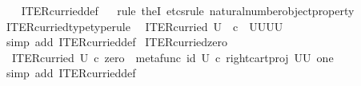 \begin{isabellebody}
%
\isadelimproof
\ \ %
\endisadelimproof
%
\isatagproof
{}\isamarkupfalse%
\ ITER{\isacharunderscore}{\kern0pt}curried{\isacharunderscore}{\kern0pt}def\isanewline
\ \ \isamarkupfalse%
{\isacharparenleft}{\kern0pt}rule\ theI{\isacharprime}{\kern0pt}{\isacharcomma}{\kern0pt}\ etcs{\isacharunderscore}{\kern0pt}rule\ natural{\isacharunderscore}{\kern0pt}number{\isacharunderscore}{\kern0pt}object{\isacharunderscore}{\kern0pt}property{}{\isacharparenright}{\kern0pt}%
\endisatagproof
{\isafoldproof}%
%
\isadelimproof
\isanewline
%
\endisadelimproof
\ \ \isanewline
{}\isamarkupfalse%
\ ITER{\isacharunderscore}{\kern0pt}curried{\isacharunderscore}{\kern0pt}type{\isacharbrackleft}{\kern0pt}type{\isacharunderscore}{\kern0pt}rule{\isacharbrackright}{\kern0pt}{\isacharcolon}{\kern0pt}\isanewline
\ \ {\isachardoublequoteopen}ITER{\isacharunderscore}{\kern0pt}curried\ U\ {\isacharcolon}{\kern0pt}\ {\isasymnat}\isactrlsub c\ {\isasymrightarrow}\ {\isacharparenleft}{\kern0pt}U\isactrlbsup U\isactrlesup {\isacharparenright}{\kern0pt}\isactrlbsup U\isactrlbsup U\isactrlesup \isactrlesup {\isachardoublequoteclose}\isanewline
%
\isadelimproof
\ \ %
\endisadelimproof
%
\isatagproof
{}\isamarkupfalse%
\ {\isacharparenleft}{\kern0pt}simp\ add{\isacharcolon}{\kern0pt}\ ITER{\isacharunderscore}{\kern0pt}curried{\isacharunderscore}{\kern0pt}def{}{\isacharparenright}{\kern0pt}%
\endisatagproof
{\isafoldproof}%
%
\isadelimproof
\isanewline
%
\endisadelimproof
\isanewline
{}\isamarkupfalse%
\ ITER{\isacharunderscore}{\kern0pt}curried{\isacharunderscore}{\kern0pt}zero{\isacharcolon}{\kern0pt}\ \isanewline
\ \ {\isachardoublequoteopen}ITER{\isacharunderscore}{\kern0pt}curried\ U\ {\isasymcirc}\isactrlsub c\ zero\ {\isacharequal}{\kern0pt}\ {\isacharparenleft}{\kern0pt}metafunc\ {\isacharparenleft}{\kern0pt}id\ U{\isacharparenright}{\kern0pt}\ {\isasymcirc}\isactrlsub c\ {\isacharparenleft}{\kern0pt}right{\isacharunderscore}{\kern0pt}cart{\isacharunderscore}{\kern0pt}proj\ {\isacharparenleft}{\kern0pt}U\isactrlbsup U\isactrlesup {\isacharparenright}{\kern0pt}\ one{\isacharparenright}{\kern0pt}{\isacharparenright}{\kern0pt}\isactrlsup {\isasymsharp}{\isachardoublequoteclose}\isanewline
%
\isadelimproof
\ \ %
\endisadelimproof
%
\isatagproof
{}\isamarkupfalse%
\ {\isacharparenleft}{\kern0pt}simp\ add{\isacharcolon}{\kern0pt}\ ITER{\isacharunderscore}{\kern0pt}curried{\isacharunderscore}{\kern0pt}def{}{\isacharparenright}{\kern0pt}%
\endisatagproof
{\isafoldproof}%

\end{isabellebody}
